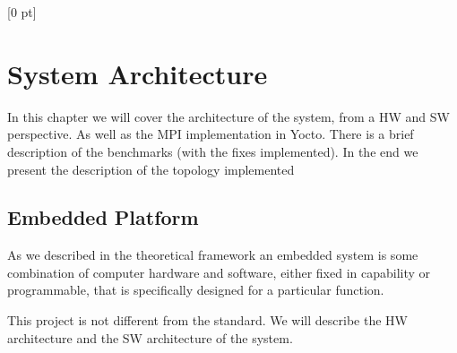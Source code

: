 \titlespacing{\chapter}{0 pt}{30 pt}{50 pt}[0 pt]
\titleformat{\section}{\Large\bfseries}{\thesection}{0 pt}{\hspace{30 pt}}
\titleformat{\subsection}{\large\bfseries}{\thesubsection}{0 pt}{\hspace{30 pt}}
\pagestyle{fancy}
\fancyhead[LO,LE]{\footnotesize\emph{\leftmark}}
\fancyhead[RO,RE]{\thepage}
\fancyfoot[CO,CE]{}

\chapter{System Architecture}

\normalsize
\noindent
In this chapter we will cover the architecture of the system, from a HW and SW
perspective. As well as the MPI implementation in Yocto. There is a brief
description of the benchmarks (with the fixes implemented). In the end we
present the description of the topology implemented

\section{Embedded Platform}
\noindent

As we described in the theoretical framework an embedded system is some
combination of computer hardware and software, either fixed in capability or
programmable, that is specifically designed for a particular function.

This project is not different from the standard. We will describe the HW
architecture and the SW architecture of the system.


